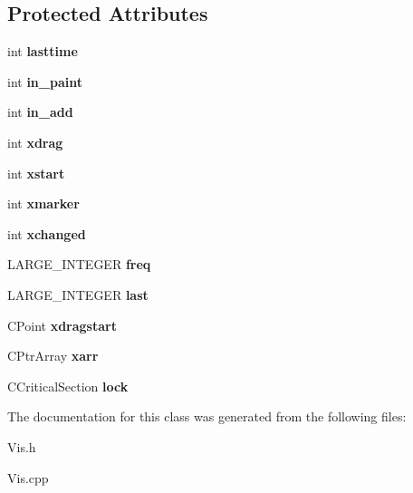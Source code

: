 \subsection*{Protected Attributes}
\begin{DoxyCompactItemize}
\item 
\hypertarget{class_c_vis_a785e042f58c1cb702b8f0e38052c13eb}{int {\bfseries lasttime}}\label{class_c_vis_a785e042f58c1cb702b8f0e38052c13eb}

\item 
\hypertarget{class_c_vis_a1270639ce293dc1ae639de48b9806a1c}{int {\bfseries in\-\_\-paint}}\label{class_c_vis_a1270639ce293dc1ae639de48b9806a1c}

\item 
\hypertarget{class_c_vis_a69fe6647cab9e9c5314ee2b6b2a989e8}{int {\bfseries in\-\_\-add}}\label{class_c_vis_a69fe6647cab9e9c5314ee2b6b2a989e8}

\item 
\hypertarget{class_c_vis_a9a152b59bc2f6980e86211540ae7655b}{int {\bfseries xdrag}}\label{class_c_vis_a9a152b59bc2f6980e86211540ae7655b}

\item 
\hypertarget{class_c_vis_a36399a9028d1bd5dc51db155ad66a97d}{int {\bfseries xstart}}\label{class_c_vis_a36399a9028d1bd5dc51db155ad66a97d}

\item 
\hypertarget{class_c_vis_a1bcbaabe4d7c095ce0e3e2ef652829ac}{int {\bfseries xmarker}}\label{class_c_vis_a1bcbaabe4d7c095ce0e3e2ef652829ac}

\item 
\hypertarget{class_c_vis_aaaa12d294ebd9e3166ecb005592af11e}{int {\bfseries xchanged}}\label{class_c_vis_aaaa12d294ebd9e3166ecb005592af11e}

\item 
\hypertarget{class_c_vis_a44bf1d665ec2003628f1cd54bf709fe3}{L\-A\-R\-G\-E\-\_\-\-I\-N\-T\-E\-G\-E\-R {\bfseries freq}}\label{class_c_vis_a44bf1d665ec2003628f1cd54bf709fe3}

\item 
\hypertarget{class_c_vis_a9ce4c08497fe18774971be04a0214c75}{L\-A\-R\-G\-E\-\_\-\-I\-N\-T\-E\-G\-E\-R {\bfseries last}}\label{class_c_vis_a9ce4c08497fe18774971be04a0214c75}

\item 
\hypertarget{class_c_vis_a43f996db87a6050fcd2cb60612757ed6}{C\-Point {\bfseries xdragstart}}\label{class_c_vis_a43f996db87a6050fcd2cb60612757ed6}

\item 
\hypertarget{class_c_vis_ad4f6cf3967a6e5f0efcace44ff80e1c1}{C\-Ptr\-Array {\bfseries xarr}}\label{class_c_vis_ad4f6cf3967a6e5f0efcace44ff80e1c1}

\item 
\hypertarget{class_c_vis_ae7a786591279378404052f58e25cdd2e}{C\-Critical\-Section {\bfseries lock}}\label{class_c_vis_ae7a786591279378404052f58e25cdd2e}

\end{DoxyCompactItemize}


The documentation for this class was generated from the following files\-:\begin{DoxyCompactItemize}
\item 
Vis.\-h\item 
Vis.\-cpp\end{DoxyCompactItemize}
